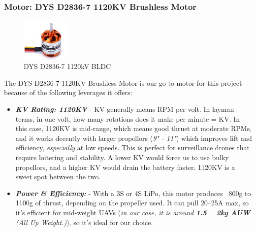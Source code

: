 \documentclass[12pt]{report}
\begin{document}
      \subsubsection{Motor: DYS D2836-7 1120KV Brushless Motor} 
      \begin{figure}
        \includegraphics[width=0.2\textwidth]{bldc.png}
        \caption{DYS D2836-7 1120kV BLDC}
        \label{fig:bldc1120}
      \end{figure}
      The DYS D2836-7 1120KV Brushless Motor is our go-to motor for this project because of the following leverages it offers:
        
      \begin{itemize}
        \item \textbf{\textit{KV Rating: 1120KV}} - KV generally means RPM per volt. In layman terms, in one volt, how many rotations does it make per minute = KV. In this case, 1120KV is mid-range, which means good thrust at moderate RPMs, and it works decently with larger propellors (\textit{9" - 11"}) which improves lift and efficiency, \textit{especially} at low speeds. This is perfect for surveillance drones that require loitering and stability. A lower KV would force us to use bulky propellors, and a higher KV would drain the battery faster. 1120KV is a sweet spot between the two.
        \item \textbf{\textit{Power \& Efficiency:}} - With a 3S or 4S LiPo, this motor produces ~800g to 1100g of thrust, depending on the propeller used. It can pull 20–25A max, so it's efficient for mid-weight UAVs (\textit{in our case, it is around \textbf{1.5 ~ 2kg AUW} (All Up Weight.)}), so it's ideal for our choice.
      \end{itemize}
      
\end{document}
